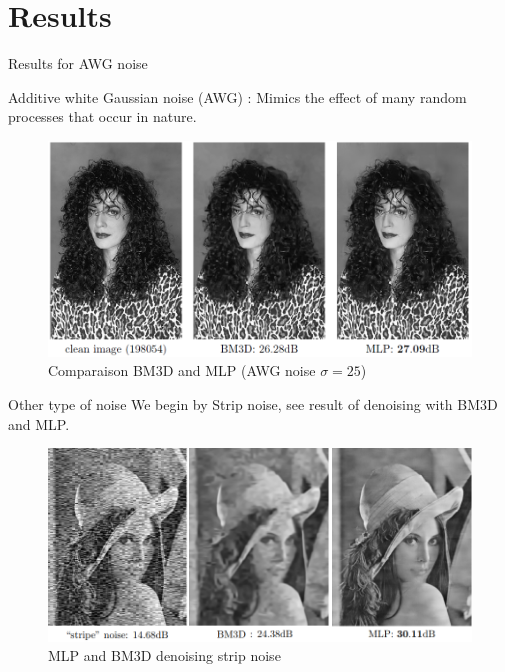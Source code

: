 \documentclass[8pt]{beamer}
\begin{document}
\section{Results}

\begin{frame}{Results for AWG noise}
\begin{mybox}[Definition]
Additive white Gaussian noise (AWG) : Mimics the effect of many random processes that occur in nature. 
\end{mybox} 

\begin{figure}[H]
    \begin{center}
        \includegraphics[scale=0.40]{../datasets/images/barbara.png}
        \caption{Comparaison BM3D and MLP (AWG noise $\sigma = 25 $)}
    \end{center}
\end{figure}
    



\end{frame}


\begin{frame}{Other type of noise}
We begin by Strip noise, see result of denoising with BM3D and MLP.

\begin{figure}[H]
    \begin{center}
        \includegraphics[scale=0.45]{../datasets/images/stripnoise.png}
        \caption{MLP and BM3D denoising strip noise}
    \end{center}
\end{figure}
\end{frame}
\end{document}
